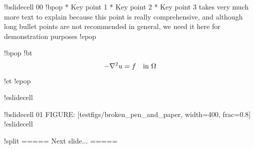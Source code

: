 \documentclass[%
oneside,                 %
final,                   %
10pt]{article}
\begin{document}
!bslidecell 00
!bpop
 * Key point 1
 * Key point 2
 * Key point 3 takes very much more text to explain because
   this point is really comprehensive, and although long
   bullet points are not recommended in general, we need
   it here for demonstration purposes
!epop

!bpop
!bt
\[ -\nabla^2 u = f \quad\hbox{in }\Omega \]
!et
!epop

!eslidecell

!bslidecell 01
FIGURE: [testfigs/broken_pen_and_paper, width=400, frac=0.8]
!eslidecell

!split
===== Next slide... =====

\eccq

\cleardoublepage{}  %
\printindex
\end{document}
